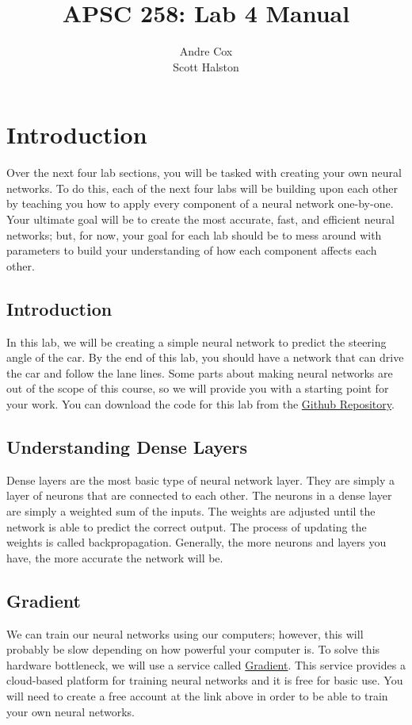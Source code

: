 \documentclass[11pt]{report}
\title{APSC 258: Lab 4 Manual}
\author{Andre Cox \\ Scott Halston}
\begin{document}
\maketitle
\tableofcontents

\clearpage

\chapter{Introduction}
Over the next four lab sections, you will be tasked with creating your own neural networks. To do this, each of the next four labs will be building upon each other by teaching you how to apply every component of a neural network one-by-one. Your ultimate goal will be to create the most accurate, fast, and efficient neural networks; but, for now, your goal for each lab should be to mess around with parameters to build your understanding of how each component affects each other.

\section{Introduction}
In this lab, we will be creating a simple neural network to predict the steering angle of the car.
By the end of this lab, you should have a network that can drive the car and follow the lane lines. Some parts about making neural networks are out of the scope of this course, so we will provide you with a starting point for your work. You can download the code for this lab from the
\href{https://github.com/PiCarV/Demos}{Github Repository}.

\section{Understanding Dense Layers}
Dense layers are the most basic type of neural network layer. They are simply a layer of neurons that are connected to each other. The neurons in a dense layer are simply a weighted sum of the inputs. The weights are adjusted until the network is able to predict the correct output. The process of updating the weights is called backpropagation. Generally, the more neurons and layers you have, the more accurate the network will be. 

\section{Gradient}
We can train our neural networks using our computers; however, this will probably be slow depending on how powerful your computer is. To solve this hardware bottleneck, we will use a service called \href{https://www.gradient.run/}{Gradient}. This service provides a cloud-based platform for training neural networks and it is free for basic use. You will need to create a free account at the link above in order to be able to train your own neural networks.
\end{document}
